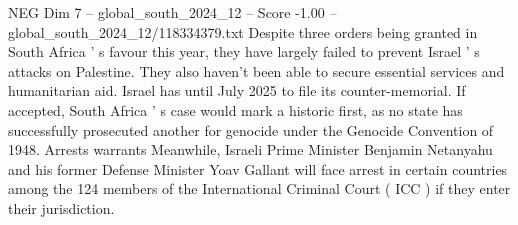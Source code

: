 \begin{textsample}{NEG Dim 7 – global\_south\_2024\_12 – Score -1.00 – global\_south\_2024\_12/118334379.txt}
Despite three orders being granted in South Africa ' s favour this year, they have largely failed to prevent Israel ' s attacks on Palestine.
They also haven't been able to secure essential services and humanitarian aid.
Israel has until July 2025 to file its counter-memorial.
If accepted, South Africa ' s case would mark a historic first, as no state has successfully prosecuted another for genocide under the Genocide Convention of 1948.
Arrests warrants Meanwhile, Israeli Prime Minister Benjamin Netanyahu and his former Defense Minister Yoav Gallant will face arrest in certain countries among the 124 members of the International Criminal Court ( ICC ) if they enter their jurisdiction.

\end{textsample}
